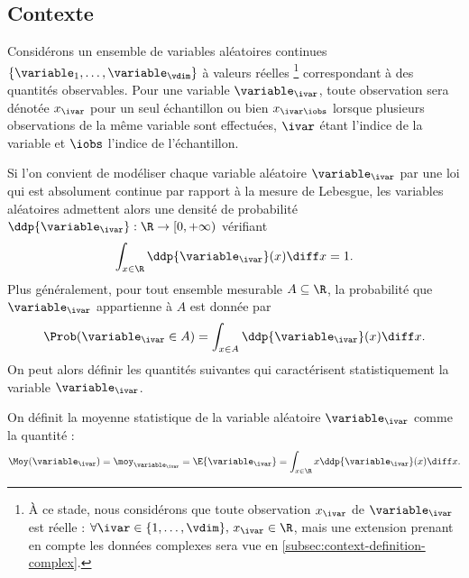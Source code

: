 \subsection{Contexte}
\label{subsec:context-definition-contexte}



Considérons un ensemble de variables aléatoires continues
$\{ \variable_1, \dots, \variable_\vdim \}$ à valeurs réelles
\footnote{
  À ce stade, nous considérons que toute observation $x_\ivar$ de
  $\variable_\ivar$ est réelle :
  $\forall \ivar\in\{1, \dots, \vdim\},\, x_\ivar \in \R$,
  mais une extension prenant en compte les données complexes sera vue
  en \cref{subsec:context-definition-complex}.
}
correspondant à des quantités observables. Pour une variable
$\variable_\ivar$, toute observation sera dénotée $x_\ivar$ pour un seul
échantillon ou bien $x_{\ivar\iobs}$ lorsque plusieurs observations de la
même variable sont effectuées, $\ivar$ étant l'indice de la variable et
$\iobs$ l'indice de l'échantillon.


Si l'on convient de modéliser chaque variable aléatoire $\variable_\ivar$ par une loi qui est
absolument continue par rapport à la mesure de Lebesgue, les variables aléatoires admettent alors
une densité de probabilité
$\ddp{\variable_\ivar}:\R\to[0,+\infty)$ vérifiant
\begin{equation*}
  \int_{x\in\R} \ddp{\variable_\ivar}(x)\diff x = 1.
  \label{eq:context-definition-normalisation-densite}
\end{equation*}
Plus généralement, pour tout ensemble mesurable $A\subseteq\R$,
la probabilité que $\variable_\ivar$ appartienne à $A$ est donnée par
\begin{equation}
  \Prob(\variable_\ivar\in A)
  =
  \int_{x\in A}\ddp{\variable_\ivar}(x)\diff x.
  \label{eq:context-definition-probabilite-densite}
\end{equation}
On peut alors définir les quantités suivantes qui caractérisent
statistiquement la variable $\variable_\ivar$.


\begin{definition}
\label{def:context-definition-moyenne}
  On définit la moyenne statistique de la variable aléatoire
  $\variable_\ivar$ comme la quantité :
\begin{equation}
  \Moy(\variable_\ivar)
  =
  \moy_{\variable_\ivar}
  =
  \E\{\variable_\ivar\}
  =
  \int_{x\in\R}
  x\ddp{\variable_\ivar}(x)\diff x.
  \label{eq:context-definition-moyenne}
\end{equation}
\end{definition}


